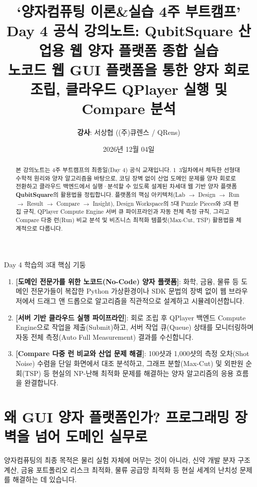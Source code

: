 \documentclass[11pt, a4paper]{article}
\title{\textbf{\Huge ‘양자컴퓨팅 이론\&실습 4주 부트캠프’}\\[0.4em]
\LARGE Day 4 공식 강의노트: QubitSquare 산업용 웹 양자 플랫폼 종합 실습\\[0.2em]
\large 노코드 웹 GUI 플랫폼을 통한 양자 회로 조립, 클라우드 QPlayer 실행 및 Compare 분석}
\author{\textbf{강사}: 서상협 ((주)큐렌스 / QRens)}
\date{2026년 12월 04일}
\theoremstyle{definition}
\begin{document}
\maketitle

\begin{abstract}
본 강의노트는 4주 부트캠프의 최종일(Day 4) 공식 교재입니다. 1~3일차에서 체득한 선형대수학적 원리와 양자 알고리즘을 바탕으로, 코딩 장벽 없이 산업 도메인 문제를 양자 회로로 전환하고 클라우드 백엔드에서 실행·분석할 수 있도록 설계된 차세대 웹 기반 양자 플랫폼 \textbf{QubitSquare}의 활용법을 정립합니다. 플랫폼의 핵심 아키텍처(Lab $\to$ Design $\to$ Run $\to$ Result $\to$ Compare $\to$ Insight), Design Workspace의 5대 Puzzle Pieces와 3대 편집 규칙, QPlayer Compute Engine 서버 큐 파이프라인과 자동 전체 측정 규칙, 그리고 Compare 다중 런(Run) 비교 분석 및 비즈니스 최적화 템플릿(Max-Cut, TSP) 활용법을 체계적으로 다룹니다.
\end{abstract}

\vspace{0.3cm}

\begin{notebox}{Day 4 학습의 3대 핵심 기둥}
\begin{enumerate}
    \item \textbf{[도메인 전문가를 위한 노코드(No-Code) 양자 플랫폼]}: 화학, 금융, 물류 등 도메인 전문가들이 복잡한 Python 가상환경이나 SDK 문법의 장벽 없이 웹 브라우저에서 드래그 앤 드롭으로 알고리즘을 직관적으로 설계하고 시뮬레이션합니다.
    \item \textbf{[서버 기반 클라우드 실행 파이프라인]}: 회로 조립 후 QPlayer 백엔드 Compute Engine으로 작업을 제출(Submit)하고, 서버 작업 큐(Queue) 상태를 모니터링하며 자동 전체 측정(Auto Full Measurement) 결과를 수신합니다.
    \item \textbf{[Compare 다중 런 비교와 산업 문제 해결]}: 100샷과 1,000샷의 측정 오차(Shot Noise) 수렴을 단일 화면에서 대조 분석하고, 그래프 분할(Max-Cut) 및 외판원 순회(TSP) 등 현실의 NP-난해 최적화 문제를 해결하는 양자 알고리즘의 응용 흐름을 완결합니다.
\end{enumerate}
\end{notebox}

\section{왜 GUI 양자 플랫폼인가? 프로그래밍 장벽을 넘어 도메인 실무로}
양자컴퓨팅의 최종 목적은 물리 실험 자체에 머무는 것이 아니라, 신약 개발 분자 구조 계산, 금융 포트폴리오 리스크 최적화, 물류 공급망 최적화 등 현실 세계의 난치성 문제를 해결하는 데 있습니다.
\end{document}
